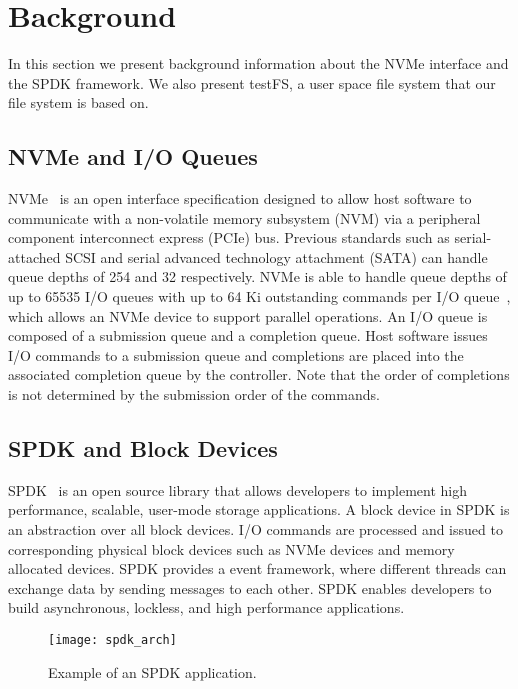 \section{Background}

In this section we present background information about the NVMe interface and
the SPDK framework. We also present testFS, a user space file system that our
file system is based on.

\subsection{NVMe and I/O Queues}

NVMe~\cite{nvme} is an open interface specification designed to allow host
software to communicate with a non-volatile memory subsystem (NVM) via a
peripheral component interconnect express (PCIe) bus. Previous standards such
as serial-attached SCSI and serial advanced technology attachment (SATA) can
handle queue depths of 254 and 32 respectively. NVMe is able to handle queue
depths of up to 65535 I/O queues with up to 64 Ki outstanding commands per I/O
queue~\cite{nvme}, which allows an NVMe device to support parallel operations.
An I/O queue is composed of a submission queue and a completion queue. Host
software issues I/O commands to a submission queue and completions are placed
into the associated completion queue by the controller. Note that the order of
completions is not determined by the submission order of the commands.

\subsection{SPDK and Block Devices}

SPDK~\cite{spdk} is an open source library that allows developers to implement
high performance, scalable, user-mode storage applications. A block device in
SPDK is an abstraction over all block devices. I/O commands are processed and
issued to corresponding physical block devices such as NVMe devices and memory
allocated devices. SPDK provides a event framework, where different threads
can exchange data by sending messages to each other. SPDK enables developers to
build asynchronous, lockless, and high performance applications.

\begin{figure}
  \centering
  \texttt{[image: spdk\_arch]}
  \caption{Example of an SPDK application.}
  \label{fig:spdk_arch}
\end{figure}

